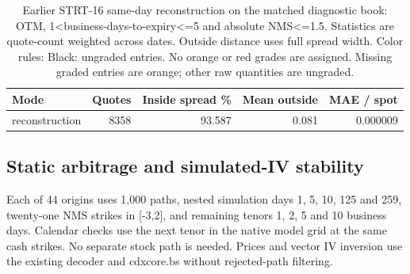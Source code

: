 \documentclass[11pt]{article}
\begin{document}
\begin{table}[H]\centering\small\setlength{\tabcolsep}{4pt}
\caption{Earlier STRT-16 same-day reconstruction on the matched diagnostic book: OTM, 1<business-days-to-expiry<=5 and absolute NMS<=1.5. Statistics are quote-count weighted across dates. Outside distance uses full spread width. Color rules: Black: ungraded entries. No orange or red grades are assigned. Missing graded entries are orange; other raw quantities are ungraded.}\label{tab:current-quotes}
\begin{tabular}{@{}lrrrr@{}}
\toprule
Mode & Quotes & Inside spread \% & Mean outside & MAE / spot \\
\midrule
reconstruction & 8358 & 93.587 & 0.081 & 0.000009 \\
\bottomrule\end{tabular}\end{table}

\subsection{Static arbitrage and simulated-IV stability}

Each of 44 origins uses 1,000 paths, nested simulation days 1, 5, 10, 125 and 259, twenty-one NMS strikes in [-3,2], and remaining tenors 1, 2, 5 and 10 business days. Calendar checks use the next tenor in the native model grid at the same cash strikes. No separate stock path is needed. Prices and vector IV inversion use the existing decoder and cdxcore.bs without rejected-path filtering.
\end{document}
